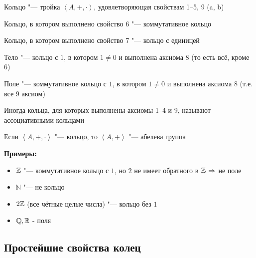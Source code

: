\begin{Def}
	Кольцо "--- тройка $\left<A, +, \cdot\right>$, удовлетворяющая свойствам 1--5, 9 (a, b)
\end{Def}
\begin{Def}
	Кольцо, в котором выполнено свойство 6 "--- коммутативное кольцо
\end{Def}
\begin{Def}
	Кольцо, в котором выполнено свойство 7 "--- кольцо с единицей
\end{Def}
\begin{Def}
	Тело "--- кольцо с $1$, в котором $1 \neq 0$ и выполнена аксиома 8 (то есть всё, кроме 6)
\end{Def}
\begin{Def}
	Поле "--- коммутативное кольцо с $1$, в котором $1 \neq 0$ и выполнена аксиома 8 (т.е. все 9 аксиом)
\end{Def}

\begin{Rem}
	Иногда кольца, для которых выполнены аксиомы 1--4 и 9, называют ассоциативными кольцами
\end{Rem}

\begin{Rem}
Если $\left<A, +, \cdot\right>$ "--- кольцо, то $\left<A, +\right>$ "--- абелева группа
\end{Rem}

\textbf{ Примеры: }
\begin{itemize}
\item $\mathbb{Z}$ "--- коммутативное кольцо с $1$, но $2$ не имеет обратного в $\mathbb{Z}$ $\Rightarrow$ не поле
\item $\mathbb{N}$ "--- не кольцо
\item $2\mathbb{Z}$ (все чётные целые числа) "--- кольцо без $1$
\item $\mathbb{Q}, \mathbb{R}$ - поля
\end{itemize}

\subsection{Простейшие свойства колец}

